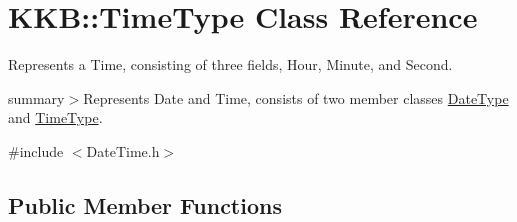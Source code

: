\hypertarget{class_k_k_b_1_1_time_type}{}\section{K\+KB\+:\+:Time\+Type Class Reference}
\label{class_k_k_b_1_1_time_type}


Represents a Time, consisting of three fields, Hour, Minute, and Second. 

summary$>$Represents Date and Time, consists of two member classes \hyperlink{class_k_k_b_1_1_date_type}{Date\+Type} and \hyperlink{class_k_k_b_1_1_time_type}{Time\+Type}. 




{\ttfamily \#include $<$Date\+Time.\+h$>$}

\subsection*{Public Member Functions}
